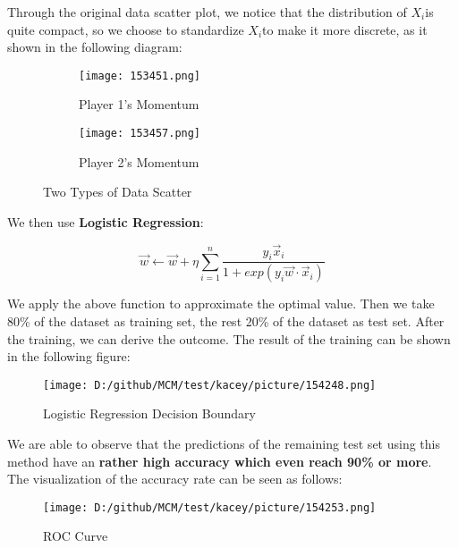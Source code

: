 \documentclass{mcmthesis}
\begin{document}
Through the original data scatter plot, we notice that the distribution of $X_{i}$is quite compact, so we choose to standardize $X_{i}$to make it more discrete, as it shown in the following diagram:

\begin{figure}[H]
    \centering
    \begin{subfigure}{0.45\textwidth}
        \centering
        \texttt{[image: 153451.png]}
        \caption{Player 1's Momentum}
        \label{subfig:player1}
    \end{subfigure}
    \hfill
    \begin{subfigure}{0.45\textwidth}
        \centering
        \texttt{[image: 153457.png]}
        \caption{Player 2's Momentum}
        \label{subfig:player2}
    \end{subfigure}
    \caption{Two Types of Data Scatter}
    \label{Figure 13}
\end{figure}

We then use {\bf Logistic Regression}:

\begin{equation} \label{6}
    \vec{w}\gets \vec{w}+\eta \sum_{i=1}^{n} \frac{y_{i}\vec{x}_{i}}{1+exp(y_{i}\vec{w}\cdot\vec{x}_{i}) }
\end{equation}

We apply the above function to approximate the optimal value. Then we take 80\% of the
dataset as training set, the rest 20\% of the dataset as test set.\cite{[5]} After the training, we can derive
the outcome. The result of the training can be shown in the following figure:

\begin{figure}[H]
    \centering
    \texttt{[image: D:/github/MCM/test/kacey/picture/154248.png]}
    \caption{Logistic Regression Decision Boundary} \label{Figure 14}
\end{figure}

We are able to observe that the predictions of the remaining test set using this method have an
{\bf rather high accuracy which even reach 90\% or more}. \\
The visualization of the accuracy rate can be seen as follows:

\begin{figure}[htbp]
    \centering
    \texttt{[image: D:/github/MCM/test/kacey/picture/154253.png]}
    \caption{ROC Curve} \label{Figure 15}
\end{figure}
\end{document}

